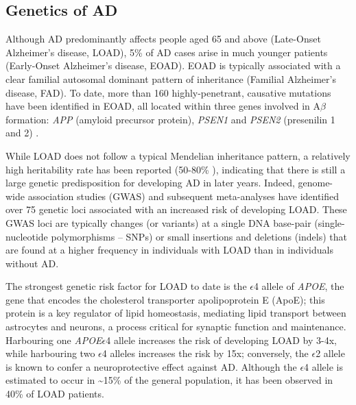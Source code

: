 \subsection{Genetics of AD}
Although AD predominantly affects people aged 65 and above (Late-Onset Alzheimer’s disease, LOAD), 5\% of AD cases arise in much younger patients (Early-Onset Alzheimer’s disease, EOAD). EOAD is typically associated with a clear familial autosomal dominant pattern of inheritance (Familial Alzheimer’s disease, FAD)\cite{Jarmolowicz2015}. To date, more than 160 highly-penetrant, causative mutations have been identified in EOAD, all located within three genes involved in A$\beta$ formation: \textit{APP} (amyloid precursor protein), \textit{PSEN1} and \textit{PSEN2} (presenilin 1 and 2) \cite{LM2010,Chai2007}. %

While LOAD does not follow a typical Mendelian inheritance pattern, a relatively high heritability rate has been reported (50-80\% \cite{Gatz2006}), indicating that there is still a large genetic predisposition for developing AD in later years. Indeed, genome-wide association studies (GWAS) and subsequent meta-analyses \cite{Bellenguez2020,Naj2020,Kunkle2019,Jansen2019,Lambert2013,Naj2011,Hollingworth2011,Harold2009,Lambert2009,Bertram2008} have identified over 75 genetic loci associated with an increased risk of developing LOAD. These GWAS loci are typically changes (or variants) at a single DNA base-pair (single-nucleotide polymorphisms – SNPs) or small insertions and deletions (indels) that are found at a higher frequency in individuals with LOAD than in individuals without AD. 

The strongest genetic risk factor for LOAD to date is the $\epsilon$4 allele of \textit{APOE}\cite{Lambert2013}, the gene that encodes the cholesterol transporter apolipoprotein E (ApoE); this protein is a key regulator of lipid homeostasis, mediating lipid transport between astrocytes and neurons, a process critical for synaptic function and maintenance\cite{DH2001}. Harbouring one \textit{APOE}$\epsilon$4 allele increases the risk of developing LOAD by 3-4x, while harbouring two $\epsilon$4 alleles increases the risk by 15x\cite{Farrer1997}; conversely, the $\epsilon$2 allele is known to confer a neuroprotective effect against AD\cite{Nagy1995,EH1994}. Although the $\epsilon$4 allele is estimated to occur in \textasciitilde 15\% of the general population, it has been observed in 40\% of LOAD patients\cite{Farrer1997}. 

